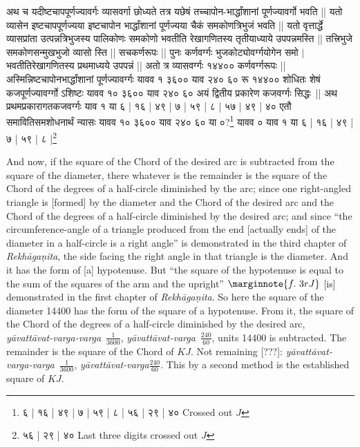 \documentclass[12pt]{book}
\let\*=\d
\def\RG{\textit{Rekh\=a\-ga\*ni\-ta}}
\def\yava{\textit{y\=avat\-t\=avat-varga}}
\def\yavava{\textit{y\=avat\-t\=avat-varga-varga}}
\begin{document}
\newpage

{\s अथ च यदीष्टचापपूर्णज्यावर्गः व्यासवर्गा छोध्यते तत्र यछेषं तच्चापोन-भार्द्धांशानां पूर्णज्यावर्गो भवति ||
यतो व्यासेन इष्टचापपूर्णज्यया
इष्टचापोन भार्द्धांशानां पूर्णज्यया चैकं समकोणत्रिभुजं भवति ||
यतो वृत्तार्द्धे
व्यासप्रांता उत्पन्नत्रिभुजस्य पालिकोणः समकोणो भवतीति रेखागणितस्य तृतीयाध्याये उपपन्नमस्ति ||
तत्त्रिभुजे समकोणसन्मुखभुजो व्यासो स्ति || सचकर्णरूपः || पुनः
कर्णवर्ग्गः भुजकोट्योवर्ग्गयोगेन समो $|$ भवतीतिरेखागणितस्य
प्रथमाध्यये उपपन्नं || अतो त्र व्यासवर्ग्गः १४४०० कर्णवर्ग्गरूपः ||
अस्मिन्निष्टचापोन\-भार्द्धांशानां पूर्णज्यावर्ग्गः यावव १ ३६०० याव २४० ६० रू १४४०० शोधितः शेषं कजपूर्णज्यावर्ग्गो ऽशिष्टः यावव १० ३६०० याव २४० ६०
अयं द्वितीय प्रकारेण कजवर्ग्गः सिद्धः~|| अथ प्रथमप्रकारागतकजवर्ग्गः याव १ या ६ | १६ | ४९ | ७ | ५९ | ८ | ५७ | ४९ | ४०
एतौ समावितिसमशोधनार्थं न्यासः यावव १० ३६०० याव २४० ६०
या ०?\footnote{{\s ६ | १६ | ४९ | ७ | ५९ | ८ | ५६ | २९ | ४० } Crossed out $J$}
यावव ० याव १ या
६ | १६ | ४९ | ७ | ५९ | ८ |\footnote{ {\s ५६ | २९ | ४०}  Last three digits crossed out $J$}}

\newpage

And now, if the square of the Chord of the desired arc is subtracted from the 
square of the diameter, there whatever is the remainder is the square of 
the Chord of the degrees of a half-circle diminished by the arc; since one
right-angled triangle is [formed] by the diameter and the Chord of the 
desired arc and the Chord of the degrees of a half-circle diminished by the
desired arc; and since ``the circumference-angle 
of a triangle produced from the end [actually ends]
of the diameter in a half-circle is a 
right angle'' is demonstrated in the third chapter of \RG,
the side facing the right angle in that triangle is the diameter. And it 
has the form of [a] hypotenuse. But ``the square of  the hypotenuse
is equal to the sum of the squares of the arm and the upright''
$\marginnote{f.~3r J}$ [is] demonstrated in the first chapter  of \RG. So here the square of the diameter
14400 has the form of the square of a hypotenuse. From it, the square of the 
Chord of the degrees of a half-circle diminished by the desired arc,
\yavava\ $\frac{1}{3600}$, \yava\ $\frac{240}{60}$, units 14400 is subtracted.
The remainder is the square of the Chord of $KJ$. Not remaining [???]: 
\yavava\ $\frac{1}{3600}$, \yava $\frac{240}{60}$. This by a second method
is the established square of $KJ$.
\end{document}
